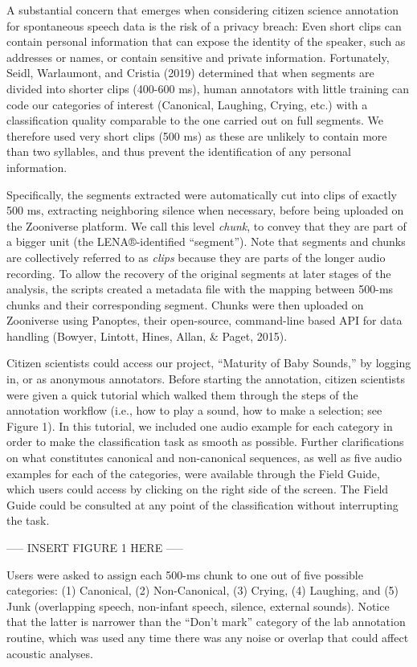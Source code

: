 \documentclass[
  english,
  ,man]{apa6}
\begin{document}
A substantial concern that emerges when considering citizen science annotation for spontaneous speech data is the risk of a privacy breach: Even short clips can contain personal information that can expose the identity of the speaker, such as addresses or names, or contain sensitive and private information. Fortunately, Seidl, Warlaumont, and Cristia (2019) determined that when segments are divided into shorter clips (400-600 ms), human annotators with little training can code our categories of interest (Canonical, Laughing, Crying, etc.) with a classification quality comparable to the one carried out on full segments. We therefore used very short clips (500 ms) as these are unlikely to contain more than two syllables, and thus prevent the identification of any personal information.

Specifically, the segments extracted were automatically cut into clips of exactly 500 ms, extracting neighboring silence when necessary, before being uploaded on the Zooniverse platform. We call this level \emph{chunk}, to convey that they are part of a bigger unit (the LENA®-identified ``segment''). Note that segments and chunks are collectively referred to as \emph{clips} because they are parts of the longer audio recording. To allow the recovery of the original segments at later stages of the analysis, the scripts created a metadata file with the mapping between 500-ms chunks and their corresponding segment. Chunks were then uploaded on Zooniverse using Panoptes, their open-source, command-line based API for data handling (Bowyer, Lintott, Hines, Allan, \& Paget, 2015).

Citizen scientists could access our project, ``Maturity of Baby Sounds,'' by logging in, or as anonymous annotators. Before starting the annotation, citizen scientists were given a quick tutorial which walked them through the steps of the annotation workflow (i.e., how to play a sound, how to make a selection; see Figure 1). In this tutorial, we included one audio example for each category in order to make the classification task as smooth as possible. Further clarifications on what constitutes canonical and non-canonical sequences, as well as five audio examples for each of the categories, were available through the Field Guide, which users could access by clicking on the right side of the screen. The Field Guide could be consulted at any point of the classification without interrupting the task.

----- INSERT FIGURE 1 HERE -----

Users were asked to assign each 500-ms chunk to one out of five possible categories: (1) Canonical, (2) Non-Canonical, (3) Crying, (4) Laughing, and (5) Junk (overlapping speech, non-infant speech, silence, external sounds). Notice that the latter is narrower than the ``Don't mark'' category of the lab annotation routine, which was used any time there was any noise or overlap that could affect acoustic analyses.
\end{document}
